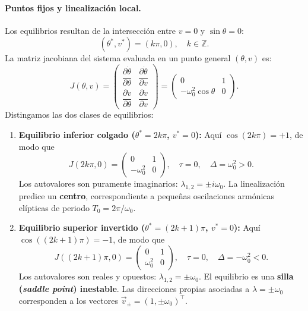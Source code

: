 \paragraph{Puntos fijos y linealización local.}
Los equilibrios resultan de la intersección entre $v=0$ y $\sin\theta=0$:
\begin{equation}
    (\theta^*, v^*) = (k\pi, 0), \quad k \in \mathbb{Z}.
\end{equation}
La matriz jacobiana del sistema evaluada en un punto general $(\theta, v)$ es:
\begin{equation}
    J(\theta, v) = \begin{pmatrix}
        \dfrac{\partial \dot{\theta}}{\partial \theta} & \dfrac{\partial \dot{\theta}}{\partial v} \\[6pt]
        \dfrac{\partial \dot{v}}{\partial \theta} & \dfrac{\partial \dot{v}}{\partial v}
    \end{pmatrix} = \begin{pmatrix} 0 & 1 \\ -\omega_0^2 \cos\theta & 0 \end{pmatrix}.
\end{equation}
Distingamos las dos clases de equilibrios:
\begin{enumerate}
    \item \textbf{Equilibrio inferior colgado ($\theta^* = 2k\pi$, $v^* = 0$):}
    Aquí $\cos(2k\pi) = +1$, de modo que
    \begin{equation}
        J(2k\pi, 0) = \begin{pmatrix} 0 & 1 \\ -\omega_0^2 & 0 \end{pmatrix}, \quad \tau = 0, \quad \Delta = \omega_0^2 > 0.
    \end{equation}
    Los autovalores son puramente imaginarios: $\lambda_{1,2} = \pm i\omega_0$. La linealización predice un \textbf{centro}, correspondiente a pequeñas oscilaciones armónicas elípticas de periodo $T_0 = 2\pi/\omega_0$.
    
    \item \textbf{Equilibrio superior invertido ($\theta^* = (2k+1)\pi$, $v^* = 0$):}
    Aquí $\cos((2k+1)\pi) = -1$, de modo que
    \begin{equation}
        J((2k+1)\pi, 0) = \begin{pmatrix} 0 & 1 \\ \omega_0^2 & 0 \end{pmatrix}, \quad \tau = 0, \quad \Delta = -\omega_0^2 < 0.
    \end{equation}
    Los autovalores son reales y opuestos: $\lambda_{1,2} = \pm \omega_0$. El equilibrio es una \textbf{silla (\emph{saddle point}) inestable}. Las direcciones propias asociadas a $\lambda = \pm \omega_0$ corresponden a los vectores $\vec{v}_{\pm} = (1, \pm\omega_0)^\top$.
\end{enumerate}

